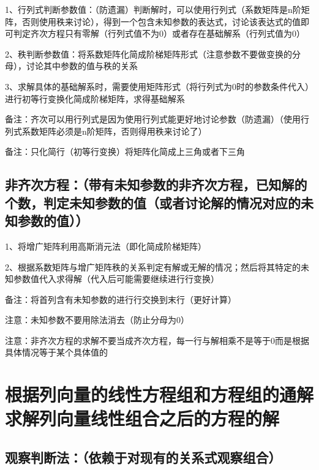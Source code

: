 1、行列式判断参数值：（防遗漏）判断解时，可以使用行列式（系数矩阵是n阶矩阵，否则使用秩来讨论），得到一个包含未知参数的表达式，讨论该表达式的值即可判定齐次方程只有零解（行列式值不为0）或者存在基础解系（行列式值为0）

2、秩判断参数值：将系数矩阵化简成阶梯矩阵形式（注意参数不要做变换的分母），讨论其中参数的值与秩的关系

3、求解具体的基础解系时，需要使用矩阵形式（将行列式为0时的参数条件代入）进行初等行变换化简成阶梯矩阵，求得基础解系

备注：齐次可以用行列式是因为使用行列式能更好地讨论参数（防遗漏）（使用行列式系数矩阵必须是n阶矩阵，否则得用秩来讨论了）

备注：只化简行（初等行变换）将矩阵化简成上三角或者下三角



\subsection{非齐次方程：（带有未知参数的非齐次方程，已知解的个数，判定未知参数的值（或者讨论解的情况对应的未知参数的值））}

1、将增广矩阵利用高斯消元法（即化简成阶梯矩阵）

2、根据系数矩阵与增广矩阵秩的关系判定有解或无解的情况；然后将其特定的未知参数值代入求得解（代入后可能需要继续进行行变换）

备注：将首列含有未知参数的进行行交换到末行（更好计算）

注意：未知参数不要用除法消去（防止分母为0）

注意：非齐次方程的求解不要当成齐次方程，每一行与解相乘不是等于0而是根据具体情况等于某个具体值的

\section{根据列向量的线性方程组和方程组的通解求解列向量线性组合之后的方程的解}



\subsection{观察判断法：（依赖于对现有的关系式观察组合）}

